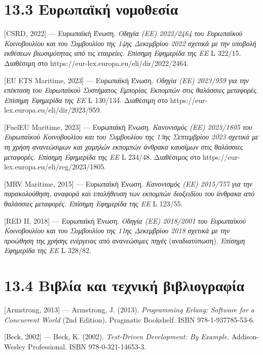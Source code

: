 \documentclass[11pt,a4paper,greek,twoside]{template-xe}
\begin{document}
\section{13.3 Ευρωπαϊκή
νομοθεσία}\label{ux3b5ux3c5ux3c1ux3c9ux3c0ux3b1ux3caux3baux3ae-ux3bdux3bfux3bcux3bfux3b8ux3b5ux3c3ux3afux3b1}

{[}CSRD, 2022{]} --- Ευρωπαϊκή Ένωση. \emph{Οδηγία (ΕΕ) 2022/2464 του
Ευρωπαϊκού Κοινοβουλίου και του Συμβουλίου της 14ης Δεκεμβρίου 2022
σχετικά με την υποβολή εκθέσεων βιωσιμότητας από τις εταιρείες}.
\emph{Επίσημη Εφημερίδα της ΕΕ} L 322/15. Διαθέσιμη στο
https://eur-lex.europa.eu/eli/dir/2022/2464.

{[}EU ETS Maritime, 2023{]} --- Ευρωπαϊκή Ένωση. \emph{Οδηγία (ΕΕ)
2023/959 για την επέκταση του Ευρωπαϊκού Συστήματος Εμπορίας Εκπομπών
στις θαλάσσιες μεταφορές}. \emph{Επίσημη Εφημερίδα της ΕΕ} L 130/134.
Διαθέσιμη στο https://eur-lex.europa.eu/eli/dir/2023/959.

{[}FuelEU Maritime, 2023{]} --- Ευρωπαϊκή Ένωση. \emph{Κανονισμός (ΕΕ)
2023/1805 του Ευρωπαϊκού Κοινοβουλίου και του Συμβουλίου της 13ης
Σεπτεμβρίου 2023 σχετικά με τη χρήση ανανεώσιμων και χαμηλών εκπομπών
άνθρακα καυσίμων στις θαλάσσιες μεταφορές}. \emph{Επίσημη Εφημερίδα της
ΕΕ} L 234/48. Διαθέσιμος στο
https://eur-lex.europa.eu/eli/reg/2023/1805.

{[}MRV Maritime, 2015{]} --- Ευρωπαϊκή Ένωση. \emph{Κανονισμός (ΕΕ)
2015/757 για την παρακολούθηση, αναφορά και επαλήθευση των εκπομπών
διοξειδίου του άνθρακα από θαλάσσιες μεταφορές}. \emph{Επίσημη Εφημερίδα
της ΕΕ} L 123/55.

{[}RED II, 2018{]} --- Ευρωπαϊκή Ένωση. \emph{Οδηγία (ΕΕ) 2018/2001 του
Ευρωπαϊκού Κοινοβουλίου και του Συμβουλίου της 11ης Δεκεμβρίου 2018
σχετικά με την προώθηση της χρήσης ενέργειας από ανανεώσιμες πηγές}
(αναδιατύπωση). \emph{Επίσημη Εφημερίδα της ΕΕ} L 328/82.

\section{13.4 Βιβλία και τεχνική
βιβλιογραφία}\label{ux3b2ux3b9ux3b2ux3bbux3afux3b1-ux3baux3b1ux3b9-ux3c4ux3b5ux3c7ux3bdux3b9ux3baux3ae-ux3b2ux3b9ux3b2ux3bbux3b9ux3bfux3b3ux3c1ux3b1ux3c6ux3afux3b1}

{[}Armstrong, 2013{]} --- Armstrong, J. (2013). \emph{Programming
Erlang: Software for a Concurrent World} (2nd Edition). Pragmatic
Bookshelf. ISBN 978-1-937785-53-6.

{[}Beck, 2002{]} --- Beck, K. (2002). \emph{Test-Driven Development: By
Example}. Addison-Wesley Professional. ISBN 978-0-321-14653-3.
\end{document}
